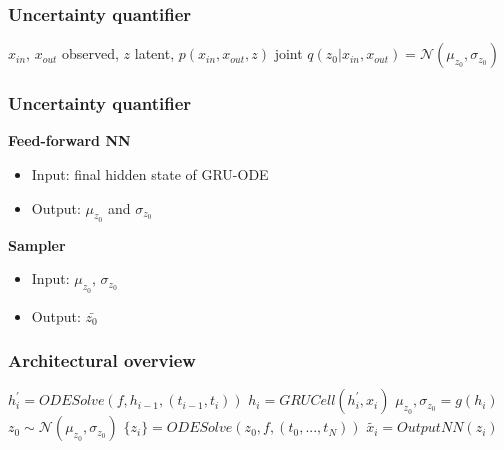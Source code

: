 \documentclass{beamer}
\begin{document}
{\begin{frame}

\end{frame}
\begin{frame}
	\frametitle{Uncertainty quantifier}
	 \center $x_{in}$, $x_{out}$ observed, $z$ latent, $p(x_{in}, x_{out}, z)$ joint
	\pause \center $q(z_{0}|x_{in}, x_{out}) =  \mathcal{N}(\mu_{z_{0}},\sigma_{z_{0}})$
\end{frame}
}
\begin{frame}
	\frametitle{Uncertainty quantifier}
	\textbf{Feed-forward NN}
	\begin{itemize}
	 \item{Input: final hidden state of GRU-ODE}
	 \item{Output: $\mu_{z_{0}}$ and $\sigma_{z_{0}}$}
	\end{itemize}
	\hfill \break
	\pause \textbf{Sampler}
	\begin{itemize}
	 \item{Input: $\mu_{z_{0}}$, $\sigma_{z_{0}}$}
	 \item{Output: $\bar{z_{0}}$}
	\end{itemize}
\end{frame}
\begin{frame}
	\frametitle{Architectural overview}
	\center $h_{i}^{'}=ODESolve(f, h_{i-1}, (t_{i-1},t_{i}))$
	\center \pause $h_{i}=GRUCell(h_{i}^{'},x_{i})$
	\center \pause $\mu_{z_{0}}, \sigma_{z_{0}} =g(h_{i})$
	\center \pause $z_{0} \sim \mathcal{N}(\mu_{z_{0}},\sigma_{z_{0}})$
	\center \pause $\{z_{i}\}=ODESolve(z_{0}, f, (t_{0},...,t_{N}))$
	\center \pause $\widetilde{x_{i}}=OutputNN(z_{i})$

\end{frame}
\end{document}
